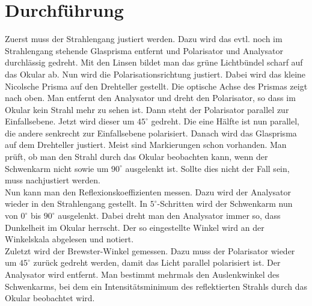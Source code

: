 \documentclass[12pt,a4paper,titlepage,headinclude,bibtotoc]{scrartcl}
\begin{document}
\section{Durchführung}
\label{sec:durchfuehrung}
Zuerst muss der Strahlengang justiert werden.
Dazu wird das evtl. noch im Strahlengang stehende Glasprisma entfernt und Polarisator und Analysator durchlässig gedreht.
Mit den Linsen bildet man das grüne Lichtbündel scharf auf das Okular ab.
Nun wird die Polarisationsrichtung justiert.
Dabei wird das kleine Nicolsche Prisma auf den Drehteller gestellt.
Die optische Achse des Prismas zeigt nach oben.
Man entfernt den Analysator und dreht den Polarisator, so dass im Okular kein Strahl mehr zu sehen ist.
Dann steht der Polarisator parallel zur Einfallsebene.
Jetzt wird dieser um $45^\circ$ gedreht.
Die eine Hälfte ist nun parallel, die andere senkrecht zur Einfallsebene polarisiert.
Danach wird das Glasprisma auf dem Drehteller justiert.
Meist sind Markierungen schon vorhanden.
Man prüft, ob man den Strahl durch das Okular beobachten kann, wenn der Schwenkarm nicht sowie um $90^\circ$ ausgelenkt ist.
Sollte dies nicht der Fall sein, muss nachjustiert werden.\\

Nun kann man den Reflexionskoeffizienten messen.
Dazu wird der Analysator wieder in den Strahlengang gestellt.
In $5^\circ$-Schritten wird der Schwenkarm nun von $0^\circ$ bis $90^\circ$ ausgelenkt.
Dabei dreht man den Analysator immer so, dass Dunkelheit im Okular herrscht.
Der so eingestellte Winkel wird an der Winkelskala abgelesen und notiert.\\

Zuletzt wird der Brewster-Winkel gemessen.
Dazu muss der Polarisator wieder um $45^\circ$ zurück gedreht werden, damit das Licht parallel polarisiert ist.
Der Analysator wird entfernt.
Man bestimmt mehrmals den Auslenkwinkel des Schwenkarms, bei dem ein Intensitätsminimum des reflektierten Strahls durch das Okular beobachtet wird.
\end{document}
